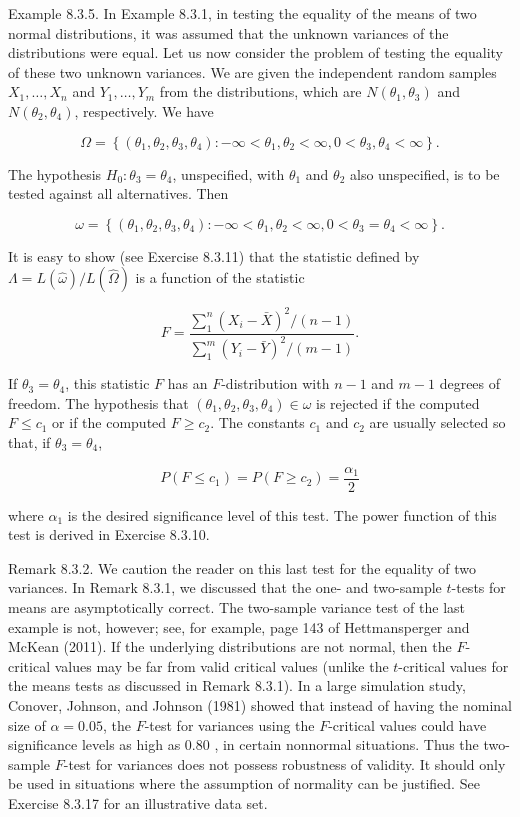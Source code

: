 Example 8.3.5. In Example 8.3.1, in testing the equality of the means of two normal distributions, it was assumed that the unknown variances of the distributions were equal. Let us now consider the problem of testing the equality of these two unknown variances. We are given the independent random samples $X_{1}, \ldots, X_{n}$ and $Y_{1}, \ldots, Y_{m}$ from the distributions, which are $N\left(\theta_{1}, \theta_{3}\right)$ and $N\left(\theta_{2}, \theta_{4}\right)$, respectively. We have

$$
\Omega=\left\{\left(\theta_{1}, \theta_{2}, \theta_{3}, \theta_{4}\right):-\infty<\theta_{1}, \theta_{2}<\infty, 0<\theta_{3}, \theta_{4}<\infty\right\} .
$$

The hypothesis $H_{0}: \theta_{3}=\theta_{4}$, unspecified, with $\theta_{1}$ and $\theta_{2}$ also unspecified, is to be tested against all alternatives. Then

$$
\omega=\left\{\left(\theta_{1}, \theta_{2}, \theta_{3}, \theta_{4}\right):-\infty<\theta_{1}, \theta_{2}<\infty, 0<\theta_{3}=\theta_{4}<\infty\right\} .
$$

It is easy to show (see Exercise 8.3.11) that the statistic defined by $\Lambda=L(\hat{\omega}) / L(\hat{\Omega})$ is a function of the statistic


\begin{equation*}
F=\frac{\sum_{1}^{n}\left(X_{i}-\bar{X}\right)^{2} /(n-1)}{\sum_{1}^{m}\left(Y_{i}-\bar{Y}\right)^{2} /(m-1)} . \tag{8.3.9}
\end{equation*}


If $\theta_{3}=\theta_{4}$, this statistic $F$ has an $F$-distribution with $n-1$ and $m-1$ degrees of freedom. The hypothesis that $\left(\theta_{1}, \theta_{2}, \theta_{3}, \theta_{4}\right) \in \omega$ is rejected if the computed $F \leq c_{1}$ or if the computed $F \geq c_{2}$. The constants $c_{1}$ and $c_{2}$ are usually selected so that, if $\theta_{3}=\theta_{4}$,

$$
P\left(F \leq c_{1}\right)=P\left(F \geq c_{2}\right)=\frac{\alpha_{1}}{2}
$$

where $\alpha_{1}$ is the desired significance level of this test. The power function of this test is derived in Exercise 8.3.10.

Remark 8.3.2. We caution the reader on this last test for the equality of two variances. In Remark 8.3.1, we discussed that the one- and two-sample $t$-tests for means are asymptotically correct. The two-sample variance test of the last example is not, however; see, for example, page 143 of Hettmansperger and McKean (2011). If the underlying distributions are not normal, then the $F$-critical values may be far from valid critical values (unlike the $t$-critical values for the means tests as discussed in Remark 8.3.1). In a large simulation study, Conover, Johnson, and Johnson (1981) showed that instead of having the nominal size of $\alpha=0.05$, the $F$-test for variances using the $F$-critical values could have significance levels as high as 0.80 , in certain nonnormal situations. Thus the two-sample $F$-test for variances does not possess robustness of validity. It should only be used in situations where the assumption of normality can be justified. See Exercise 8.3.17 for an illustrative data set.

